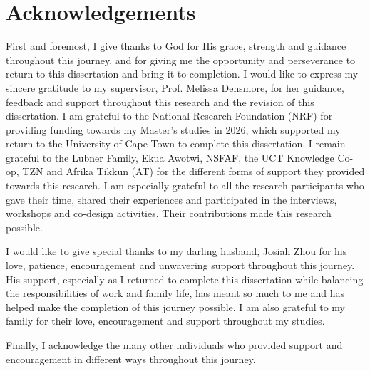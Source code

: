 \chapter*{Acknowledgements}
\thispagestyle{plain}

First and foremost, I give thanks to God for His grace, strength and guidance throughout this journey, and for giving me the opportunity and perseverance to return to this dissertation and bring it to completion. I would like to express my sincere gratitude to my supervisor, Prof. Melissa Densmore, for her guidance, feedback and support throughout this research and the revision of this dissertation. I am grateful to the National Research Foundation (NRF) for providing funding towards my Master's studies in 2026, which supported my return to the University of Cape Town to complete this dissertation. I remain grateful to the Lubner Family, Ekua Awotwi, NSFAF, the UCT Knowledge Co-op, TZN and Afrika Tikkun (AT) for the different forms of support they provided towards this research. I am especially grateful to all the research participants who gave their time, shared their experiences and participated in the interviews, workshops and co-design activities. Their contributions made this research possible. 

I would like to give special thanks to my darling husband, Josiah Zhou for his love, patience, encouragement and unwavering support throughout this journey. His support, especially as I returned to complete this dissertation while balancing the responsibilities of work and family life, has meant so much to me and has helped make the completion of this journey possible. I am also grateful to my family for their love, encouragement and support throughout my studies.

Finally, I acknowledge the many other individuals who provided support and encouragement in different ways throughout this journey.